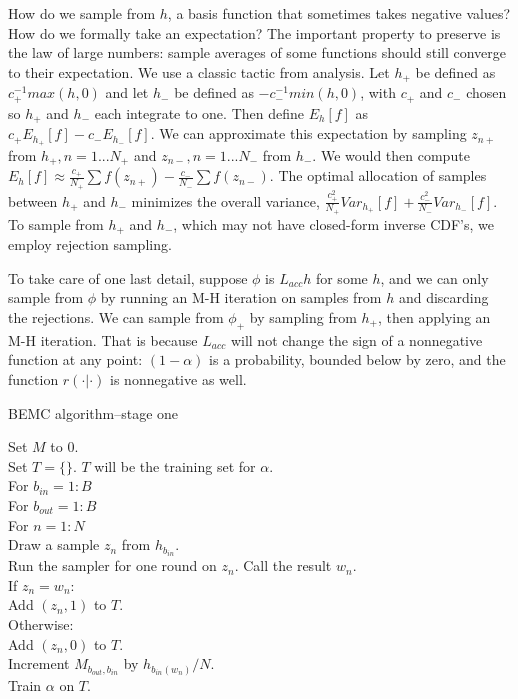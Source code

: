 \documentclass{article}
\begin{document}
How do we sample from $h$, a basis function that sometimes takes negative values? How do we formally take an expectation? The important property to preserve is the law of large numbers: sample averages of some functions should still converge to their expectation. We use a classic tactic from analysis. Let $h_+$ be defined as $c_+^{-1}max(h, 0)$ and let $h_-$ be defined as $-c_-^{-1}min(h, 0)$, with $c_+$ and $c_-$ chosen so $h_+$ and $h_-$ each integrate to one. Then define $E_{h}[f]$ as $c_+E_{h_+}[f]-c_-E_{h_-}[f]$. We can approximate this expectation by sampling $z_{n+}$ from $h_+, n=1...N_+$ and $z_{n-}, n=1...N_-$ from $h_-$. We would then compute $E_{h}[f] \approx \frac{c_+}{N_+}\sum f(z_{n+})-\frac{c_-}{N_-}\sum f(z_{n-})$. The optimal allocation of samples between $h_+$ and $h_-$ minimizes the overall variance, $\frac{c_+^2}{N_+}Var_{h_+}[f] + \frac{c_-^2}{N_-}Var_{h_-}[f]$. To sample from $h_+$ and $h_-$, which may not have closed-form inverse CDF's, we employ rejection sampling. 

To take care of one last detail, suppose $\phi$ is $L_{acc}h$ for some $h$, and we can only sample from $\phi$ by running an M-H iteration on samples from $h$ and discarding the rejections. We can sample from $\phi_+$ by sampling from $h_+$, then applying an M-H iteration. That is because $L_{acc}$ will not change the sign of a nonnegative function at any point: $(1-\alpha)$ is a probability, bounded below by zero, and the function $r(\cdot | \cdot)$ is nonnegative as well. 

\begin{algorithm}[h]
\caption{BEMC algorithm--stage one}
Set $M$ to $0$.\\
Set $T = \{\}$. $T$ will be the training set for $\alpha$.\\
For $b_{in}  = 1:B$\\
\Indp
For $b_{out}  = 1:B$\\
\Indp
For $n = 1:N$\\
\Indp
Draw a sample $z_n$ from $h_{b_{in}}$.\\
Run the sampler for one round on $z_n$. Call the result $w_n$.\\
If $z_n = w_n$:\\
\Indp
Add $(z_n, 1)$ to $T$.\\
\Indm
Otherwise:\\
\Indp
Add $(z_n, 0)$ to $T$.\\
Increment $M_{b_{out}, b_{in}}$ by $h_{b_{in}(w_n)}/N$.\\
\Indm
\Indm
\Indm
Train $\alpha$ on $T$.\\
\end{algorithm}
\end{document}
